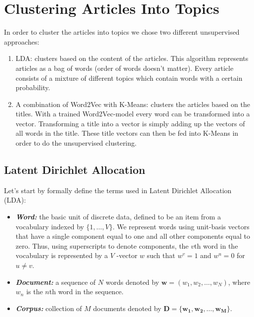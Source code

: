 \section{Clustering Articles Into Topics}
\label{sec:topic_detection}

In order to cluster the articles into topics we chose two different unsupervised approaches: 

\begin{enumerate}
\item LDA: clusters based on the content of the articles. This algorithm represents articles as a bag of words (order of words doesn't matter). Every article consists of a mixture of different topics which contain words with a certain probability. 
\item A combination of Word2Vec with K-Means: clusters the articles based on the titles. With a trained Word2Vec-model every word can be transformed into a vector. Transforming a title into a vector is simply adding up the vectors of all words in the title. These title vectors can then be fed into K-Means in order to do the unsupervised clustering.
\end{enumerate}


\subsection{Latent Dirichlet Allocation}
Let's start by formally define the terms used in Latent Dirichlet Allocation (LDA):

\begin{itemize} 
\item \textbf{\textit{Word:}} the basic unit of discrete data, defined to be an item from a vocabulary indexed by
$\{1, \dotsc, V\}$. We represent words using unit-basis vectors that have a single component equal to one and all other components equal to zero. Thus, using superscripts to denote components, the $v$th word in the vocabulary is represented by a $V$ -vector $w$ such that $w^v = 1$ and $w^u = 0$ for $u \neq v$.
\item \textbf{\textit{Document:}}  a sequence of $N$ words denoted by $\mathbf{w} = (w_1, w_2, \dotsc, w_N)$, where $w_n$ is the $n$th word in the sequence.
\item \textbf{\textit{Corpus:}} collection of $M$ documents denoted by $\mathbf{D = \{w_1,w_2, \dotsc, w_M\}}$.
\end{itemize}

